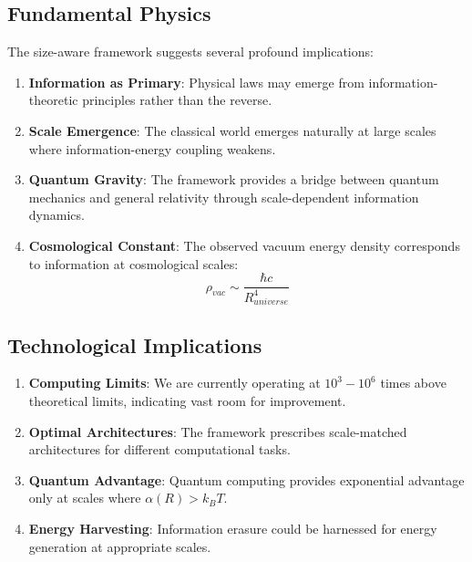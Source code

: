 \documentclass[11pt,a4paper]{article}
\theoremstyle{definition}
\begin{document}
\subsection{Fundamental Physics}

The size-aware framework suggests several profound implications:

\begin{enumerate}
\item \textbf{Information as Primary}: Physical laws may emerge from information-theoretic principles rather than the reverse.

\item \textbf{Scale Emergence}: The classical world emerges naturally at large scales where information-energy coupling weakens.

\item \textbf{Quantum Gravity}: The framework provides a bridge between quantum mechanics and general relativity through scale-dependent information dynamics.

\item \textbf{Cosmological Constant}: The observed vacuum energy density corresponds to information at cosmological scales:
\begin{equation}
\rho_{vac} \sim \frac{\hbar c}{R_{universe}^4}
\end{equation}
\end{enumerate}

\subsection{Technological Implications}

\begin{enumerate}
\item \textbf{Computing Limits}: We are currently operating at $10^3-10^6$ times above theoretical limits, indicating vast room for improvement.

\item \textbf{Optimal Architectures}: The framework prescribes scale-matched architectures for different computational tasks.

\item \textbf{Quantum Advantage}: Quantum computing provides exponential advantage only at scales where $\alpha(R) > k_B T$.

\item \textbf{Energy Harvesting}: Information erasure could be harnessed for energy generation at appropriate scales.
\end{enumerate}
\end{document}
